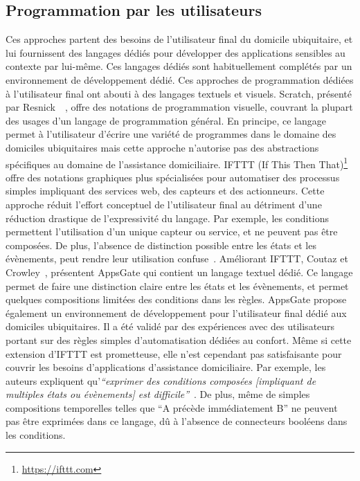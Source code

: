 \subsection{Programmation par les utilisateurs}
Ces approches partent des besoins de l'utilisateur final du domicile 
ubiquitaire, et lui fournissent des langages dédiés pour développer des applications 
sensibles au contexte par lui-même. Ces langages dédiés sont habituellement complétés par un 
environnement de développement dédié. Ces approches de programmation dédiées à 
l'utilisateur final ont abouti à des langages textuels et visuels. Scratch, 
présenté par Resnick~\etal~\parencite{resnick2009scratch}, offre des notations de 
programmation visuelle, couvrant la plupart des usages d'un langage de 
programmation général. En principe, ce langage permet à l'utilisateur d'écrire 
une variété de programmes dans le domaine des domiciles ubiquitaires mais cette 
approche n'autorise pas des abstractions spécifiques au domaine de l'assistance 
domiciliaire. IFTTT (If This Then That)\footnote{\url{https://ifttt.com}} offre des 
notations graphiques plus spécialisées pour automatiser des processus simples 
impliquant des services web, des capteurs et des actionneurs. Cette approche 
réduit l'effort conceptuel de l'utilisateur final au détriment d'une réduction 
drastique de l'expressivité du langage. Par exemple, les conditions permettent 
l'utilisation d'un unique capteur ou service, et ne peuvent pas être composées. 
De plus, l'absence de distinction possible entre les états et les évènements, 
peut rendre leur utilisation confuse~\parencite{Huang2015supporting}.
Améliorant IFTTT, Coutaz et Crowley~\parencite{coutaz2016first}, présentent AppsGate qui contient un 
langage textuel dédié. Ce langage permet de faire une distinction claire entre 
les états et les évènements, et permet quelques compositions limitées des conditions 
dans les règles. AppsGate propose également un environnement de développement pour 
l'utilisateur final dédié aux domiciles ubiquitaires. Il a été validé par des expériences avec des
utilisateurs portant sur des règles simples d'automatisation dédiées au confort. Même si 
cette extension d'IFTTT est prometteuse, elle n'est cependant pas satisfaisante 
pour couvrir les besoins d'applications d'assistance domiciliaire. Par exemple, 
les auteurs expliquent qu'{\it``exprimer des conditions composées [impliquant de 
multiples états ou évènements] est difficile''}~\parencite{coutaz2016first}.
De plus, même de simples compositions temporelles telles que ``A précède 
immédiatement B'' ne peuvent pas être exprimées dans ce langage, dû à
l'absence de connecteurs booléens dans les conditions.

